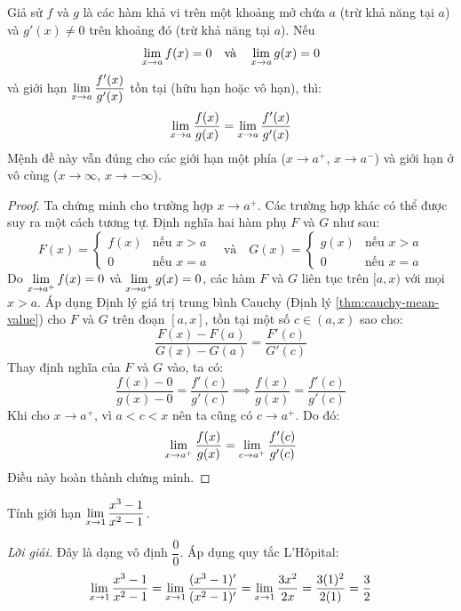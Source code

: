 \begin{proposition}
\label{prop:lhopital-zero}
Giả sử $f$ và $g$ là các hàm khả vi trên một khoảng mở chứa $a$ (trừ khả năng tại $a$) và $g'(x) \neq 0$ trên khoảng đó (trừ khả năng tại $a$). Nếu
$$ \lim\limits_{x \to a} f(x) = 0 \quad \text{và} \quad \lim\limits_{x \to a} g(x) = 0 $$
và giới hạn $\lim\limits_{x \to a} \dfrac{f'(x)}{g'(x)}$ tồn tại (hữu hạn hoặc vô hạn), thì:
$$ \lim\limits_{x \to a} \dfrac{f(x)}{g(x)} = \lim\limits_{x \to a} \dfrac{f'(x)}{g'(x)} $$
Mệnh đề này vẫn đúng cho các giới hạn một phía ($x \to a^+$, $x \to a^-$) và giới hạn ở vô cùng ($x \to \infty$, $x \to -\infty$).
\end{proposition}

\begin{proof}
Ta chứng minh cho trường hợp $x \to a^+$. Các trường hợp khác có thể được suy ra một cách tương tự.
Định nghĩa hai hàm phụ $F$ và $G$ như sau:
$$ F(x) = \begin{cases} f(x) & \text{nếu } x > a \\ 0 & \text{nếu } x = a \end{cases} \quad \text{và} \quad G(x) = \begin{cases} g(x) & \text{nếu } x > a \\ 0 & \text{nếu } x = a \end{cases} $$
Do $\lim\limits_{x \to a^+} f(x) = 0$ và $\lim\limits_{x \to a^+} g(x) = 0$, các hàm $F$ và $G$ liên tục trên $[a, x)$ với mọi $x>a$. Áp dụng Định lý giá trị trung bình Cauchy (Định lý \ref{thm:cauchy-mean-value}) cho $F$ và $G$ trên đoạn $[a, x]$, tồn tại một số $c \in (a, x)$ sao cho:
$$ \dfrac{F(x) - F(a)}{G(x) - G(a)} = \dfrac{F'(c)}{G'(c)} $$
Thay định nghĩa của $F$ và $G$ vào, ta có:
$$ \dfrac{f(x) - 0}{g(x) - 0} = \dfrac{f'(c)}{g'(c)} \implies \dfrac{f(x)}{g(x)} = \dfrac{f'(c)}{g'(c)} $$
Khi cho $x \to a^+$, vì $a < c < x$ nên ta cũng có $c \to a^+$. Do đó:
$$ \lim\limits_{x \to a^+} \dfrac{f(x)}{g(x)} = \lim\limits_{c \to a^+} \dfrac{f'(c)}{g'(c)} $$
Điều này hoàn thành chứng minh.
\end{proof}

\begin{example}
Tính giới hạn $\lim\limits_{x \to 1} \dfrac{x^3 - 1}{x^2 - 1}$.

\textit{Lời giải.}
Đây là dạng vô định $\dfrac{0}{0}$. Áp dụng quy tắc L'Hôpital:
$$ \lim\limits_{x \to 1} \dfrac{x^3 - 1}{x^2 - 1} = \lim\limits_{x \to 1} \dfrac{(x^3 - 1)'}{(x^2 - 1)'} = \lim\limits_{x \to 1} \dfrac{3x^2}{2x} = \dfrac{3(1)^2}{2(1)} = \dfrac{3}{2} $$
\end{example}

